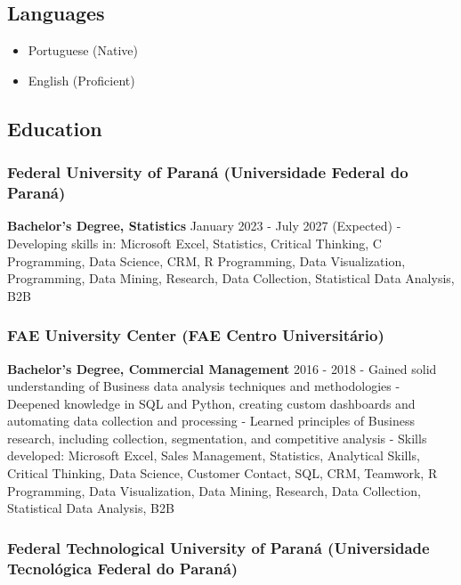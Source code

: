 \documentclass[
]{article}
\providecommand{\tightlist}{%
  \setlength{\itemsep}{0pt}\setlength{\parskip}{0pt}}
\begin{document}
\subsection{Languages}\label{languages}

\begin{itemize}
\tightlist
\item
  Portuguese (Native)
\item
  English (Proficient)
\end{itemize}

\subsection{Education}\label{education}

\subsubsection{Federal University of Paraná (Universidade Federal do
Paraná)}\label{federal-university-of-paranuxe1-universidade-federal-do-paranuxe1}

\textbf{Bachelor's Degree, Statistics} \textbar{} January 2023 - July
2027 (Expected) - Developing skills in: Microsoft Excel, Statistics,
Critical Thinking, C Programming, Data Science, CRM, R Programming, Data
Visualization, Programming, Data Mining, Research, Data Collection,
Statistical Data Analysis, B2B

\subsubsection{FAE University Center (FAE Centro
Universitário)}\label{fae-university-center-fae-centro-universituxe1rio}

\textbf{Bachelor's Degree, Commercial Management} \textbar{} 2016 - 2018
- Gained solid understanding of Business data analysis techniques and
methodologies - Deepened knowledge in SQL and Python, creating custom
dashboards and automating data collection and processing - Learned
principles of Business research, including collection, segmentation, and
competitive analysis - Skills developed: Microsoft Excel, Sales
Management, Statistics, Analytical Skills, Critical Thinking, Data
Science, Customer Contact, SQL, CRM, Teamwork, R Programming, Data
Visualization, Data Mining, Research, Data Collection, Statistical Data
Analysis, B2B

\subsubsection{Federal Technological University of Paraná (Universidade
Tecnológica Federal do
Paraná)}\label{federal-technological-university-of-paranuxe1-universidade-tecnoluxf3gica-federal-do-paranuxe1}
\end{document}
